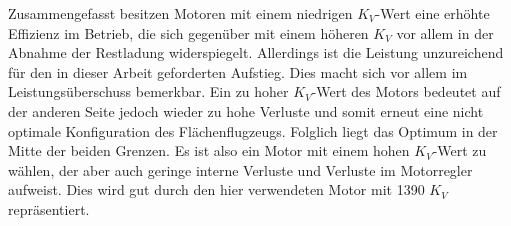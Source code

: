 Zusammengefasst besitzen Motoren mit einem niedrigen \ensuremath{K_V}-Wert eine erhöhte Effizienz im Betrieb, die sich gegenüber mit einem höheren \ensuremath{K_V} vor allem in der Abnahme der Restladung widerspiegelt. Allerdings ist die Leistung unzureichend für den in dieser Arbeit geforderten Aufstieg. Dies macht sich vor allem im Leistungsüberschuss bemerkbar. Ein zu hoher \ensuremath{K_V}-Wert des Motors bedeutet auf der anderen Seite jedoch wieder zu hohe Verluste und somit erneut eine nicht optimale Konfiguration des Flächenflugzeugs. Folglich liegt das Optimum in der Mitte der beiden Grenzen. Es ist also ein Motor mit einem hohen \ensuremath{K_V}-Wert zu wählen, der aber auch geringe interne Verluste und Verluste im Motorregler aufweist. Dies wird gut durch den hier verwendeten Motor mit 1390 \ensuremath{K_V} repräsentiert. \\



